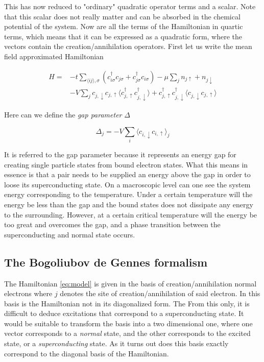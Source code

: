 \documentclass[11pt]{article}
\begin{document}
This has now reduced to "ordinary" quadratic operator terms and a scalar. Note that this scalar does not really matter and can be absorbed in the chemical potential of the system. Now are all the terms of the Hamiltonian in quartic terms, which means that it can be expressed as a quadratic form, where the vectors contain the creation/annihilation operators. First let us write the mean field approximated Hamiltonian

\begin{align}\label{eq:mf-model}
	H = &-t \sum_{\langle i j\rangle, \sigma}\left(c_{i \sigma}^{\dagger} c_{j \sigma} + c_{j \sigma}^{\dagger} c_{i \sigma}\right) - \mu \sum_j n_{j \uparrow}+n_{j \downarrow}  \nonumber \\ 
	    &- V \sum_j  c_{j, \downarrow}c_{j, \uparrow} \langle c_{j, \uparrow}^{\dagger}c_{j, \downarrow}^{\dagger} \rangle  + c_{j, \uparrow}^{\dagger}c_{j, \downarrow}^{\dagger}\langle c_{j, \downarrow}c_{j, \uparrow} \rangle 
\end{align}

Here can we define the \textit{gap parameter} $\Delta$ 

\begin{equation}\label{eq:self-cons-v1}
	\Delta_j = -V \sum_{i} \langle c_{i, \downarrow}c_{i, \uparrow} \rangle_j
\end{equation}

It is referred to the gap parameter because it represents an energy gap for creating single particle states from bound electron states. What this means in essence is that a pair needs to be supplied an energy above the gap in order to loose its superconducting state. On a macroscopic level can one see the system energy corresponding to the temperature. Under a certain temperature will the energy be less than the gap and the bound states does not dissipate any energy to the surrounding. However, at a certain critical temperature will the energy be too great and overcomes the gap, and a phase transition between the superconducting and normal state occurs. 


\subsection{The Bogoliubov de Gennes formalism}
The Hamiltonian \eqref{eq:model} is given in the basis of creation/annihilation normal electrons where $j$ denotes the site of creation/annihilation of said electron. In this basis is the Hamiltonian not in its diagonalized form. The  From this only, it is difficult to deduce excitations that correspond to a superconducting state. It would be suitable to transform the basis into a two dimensional one, where one vector corresponds to a \textit{normal} state, and the other corresponds to the excited state, or a \textit{superconducting} state. As it turns out does this basis exactly correspond to the diagonal basis of the Hamiltonian. 
\end{document}
